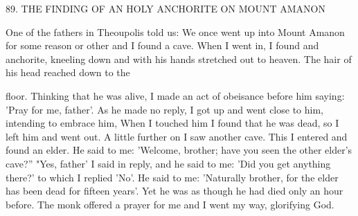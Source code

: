 89.
THE FINDING OF AN HOLY ANCHORITE
ON MOUNT AMANON

One of the fathers in Theoupolis told us: We once went up into
Mount Amanon for some reason or other and I found a cave.
When
I went in, I found and anchorite, kneeling down and with his hands
stretched out to heaven.
The hair of his head reached down to the

floor.
Thinking that he was alive, I made an act of obeisance before
him saying: 'Pray for me, father'.
As he made no reply, I got up and
went close to him, intending to embrace him, When I touched him
I found that he was dead, so I left him and went out.
A little further
on I saw another cave.
This I entered and found an elder.
He said
to me: 'Welcome, brother; have you seen the other elder's cave?”
"Yes, father' I said in reply, and he said to me: 'Did you get
anything there?' to which I replied 'No'.
He said to me: 'Naturally
brother, for the elder has been dead for fifteen years'.
Yet he was as
though he had died only an hour before.
The monk offered a prayer
for me and I went my way, glorifying God.


